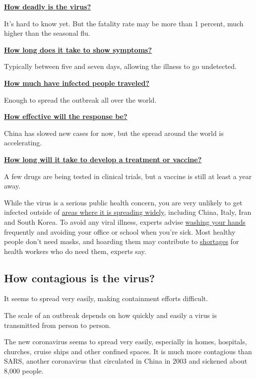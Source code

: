 \protect\hyperlink{virulence}{\textbf{How deadly is the virus?}}

It's hard to know yet. But the fatality rate may be more than 1 percent,
much higher than the seasonal flu.

\protect\hyperlink{contagiousperiod}{\textbf{How long does it take to
show symptoms?}}

Typically between five and seven days, allowing the illness to go
undetected.

\protect\hyperlink{travel}{\textbf{How much have infected people
traveled?}}

Enough to spread the outbreak all over the world.

\protect\hyperlink{response}{\textbf{How effective will the response
be?}}

China has slowed new cases for now, but the spread around the world is
accelerating.

\protect\hyperlink{vaccine}{\textbf{How long will it take to develop a
treatment or vaccine?}}

A few drugs are being tested in clinical trials, but a vaccine is still
at least a year away.

While the virus is a serious public health concern, you are very
unlikely to get infected outside of
\href{https://www.nytimes.com/interactive/2020/world/coronavirus-maps.html}{areas
where it is spreading widely}, including China, Italy, Iran and South
Korea. To avoid any viral illness, experts advise
\href{https://www.nytimes.com/2020/01/28/opinion/coronavirus-prevention-tips.html}{washing
your hands} frequently and avoiding your office or school when you're
sick. Most healthy people don't need masks, and hoarding them may
contribute to
\href{https://www.nytimes.com/2020/01/29/health/coronavirus-masks-hoarding.html}{shortages}
for health workers who do need them, experts say.

\hypertarget{how-contagious-is-the-virus}{%
\subsection{How contagious is the
virus?}\label{how-contagious-is-the-virus}}

It seems to spread very easily, making containment efforts difficult.

The scale of an outbreak depends on how quickly and easily a virus is
transmitted from person to person.

The new coronavirus seems to spread very easily, especially in homes,
hospitals, churches, cruise ships and other confined spaces. It is much
more contagious than SARS, another coronavirus that circulated in China
in 2003 and sickened about 8,000 people.

